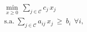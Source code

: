 \documentclass[preview]{standalone}
\begin{document}
\begin{align*}
\min_{x\ge 0}\ \sum_{j\in\mathcal{C}} c_j\,x_j\\\text{s.a.}\; \sum_{j\in\mathcal{C}} a_{ij}\,x_j \ \ge\ b_i\ \ \forall i,
\end{align*}
\end{document}
